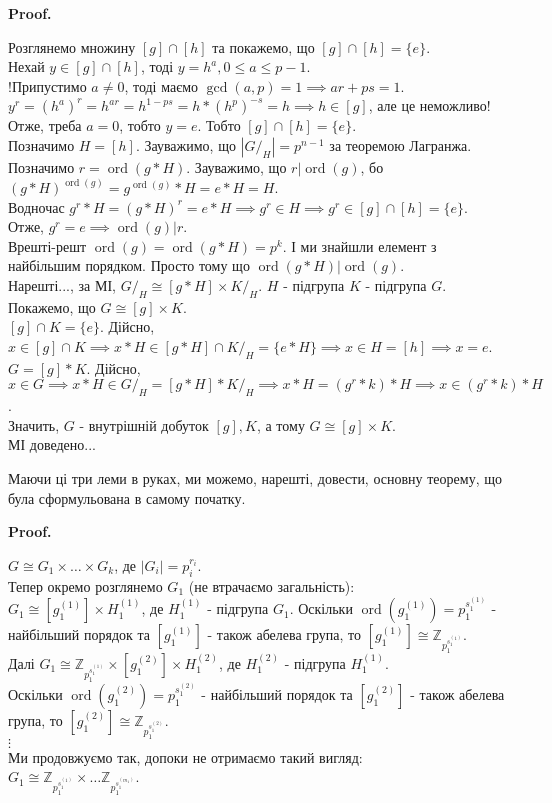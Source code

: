 \documentclass[a4paper, 10pt]{article}
\makeatletter
\theoremstyle{theoremdd}
\theoremstyle{theoremdd}
\theoremstyle{theoremdd}
\theoremstyle{theoremdd}
\theoremstyle{theoremdd}
\theoremstyle{theoremdd}
\theoremstyle{theoremdd}
\theoremstyle{theoremdd}
\theoremstyle{theoremdd}
\theoremstyle{theoremdd}
\theoremstyle{theoremdd}
\theoremstyle{theoremdd}
\theoremstyle{theoremdd}
\theoremstyle{theoremdd}
\theoremstyle{theoremdd}
\renewenvironment{proof}[1][Proof.\\]{\par
\pushQED{\hfill \qed}%
\normalfont \topsep6\p@\@plus6\p@\relax
\trivlist
\item\relax
{\bfseries
#1\@addpunct{.}}\hspace\labelsep\ignorespaces
}{%
\popQED\endtrivlist\@endpefalse
}
\DeclareMathOperator{\ord}{ord}
\makeatother
\begin{document}
\begin{proof}
Розглянемо множину $[g] \cap [h]$ та покажемо, що $[g] \cap [h] = \{e\}$.\\
Нехай $y \in [g] \cap [h]$, тоді $y = h^a, 0 \leq a \leq p-1$.\\
!Припустимо $a \neq 0$, тоді маємо $\gcd(a,p) = 1 \implies ar+ps=1$.\\
$y^r = (h^a)^r = h^{ar} = h^{1-ps} = h*(h^{p})^{-s} = h \implies h \in [g]$, але це неможливо!\\
Отже, треба $a = 0$, тобто $y = e$. Тобто $[g] \cap [h] = \{e\}$.\\
Позначимо $H = [h]$. Зауважимо, що $|G/_H| = p^{n-1}$ за теоремою Лагранжа. Позначимо $r = \ord(g*H)$. Зауважимо, що $r | \ord(g)$, бо\\
$(g*H)^{\ord(g)} = g^{\ord(g)}*H = e*H = H$.\\
Водночас $g^r*H = (g*H)^r = e*H \implies g^r \in H \implies g^r \in [g] \cap [h] = \{e\}$.\\
Отже, $g^r = e \implies \ord(g) | r$.\\
Врешті-решт $\ord(g) = \ord(g*H) = p^k$. І ми знайшли елемент з найбільшим порядком. Просто тому що $\ord(g*H) | \ord(g)$.\\
Нарешті..., за МІ, $G/_H \cong [g*H] \times K/_H$. $H$ - підгрупа $K$ - підгрупа $G$.\\
Покажемо, що $G \cong [g] \times K$.\\
$[g] \cap K = \{e\}$. Дійсно, $x \in [g] \cap K \implies x*H \in [g*H] \cap K/_H = \{e*H\} \implies x \in H = [h] \implies x = e$.\\
$G = [g]*K$. Дійсно, $x \in G \implies x*H \in G/_H = [g*H]*K/_H \implies x*H = (g^r*k)*H \implies x \in (g^r*k)*H$.\\
Значить, $G$ - внутрішній добуток $[g],K$, а тому $G \cong [g] \times K$.\\
МІ доведено...
\end{proof}

Маючи ці три леми в руках, ми можемо, нарешті, довести, основну теорему, що була сформульована в самому початку.
\begin{proof}
$G \cong G_1 \times \dots \times G_k$, де $|G_i| = p_i^{r_i}$.\\
Тепер окремо розглянемо $G_1$ (не втрачаємо загальність):\\
$G_1 \cong [g_1^{(1)}] \times H_1^{(1)}$, де $H_1^{(1)}$ - підгрупа $G_1$. Оскільки $\ord(g_1^{(1)}) = p_1^{s_1^{(1)}}$ - найбільший порядок та $[g_1^{(1)}]$ - також абелева група, то $[g_1^{(1)}] \cong \mathbb{Z}_{p_1^{s_1^{(1)}}}$.\\
Далі $G_1 \cong \mathbb{Z}_{p_1^{s_1^{(1)}}} \times [g_1^{(2)}] \times H_1^{(2)}$, де $H_1^{(2)}$ - підгрупа $H_1^{(1)}$.\\
Оскільки $\ord(g_1^{(2)}) = p_1^{s_1^{(2)}}$ - найбільший порядок та $[g_1^{(2)}]$ - також абелева група, то $[g_1^{(2)}] \cong \mathbb{Z}_{p_1^{s_1^{(2)}}}$.\\
$\vdots$\\
Ми продовжуємо так, допоки не отримаємо такий вигляд:\\
$G_1 \cong \mathbb{Z}_{p_1^{s_1^{(1)}}} \times \dots \mathbb{Z}_{p_1^{s_1^{(m_1)}}}$.
\end{proof}
\end{document}
